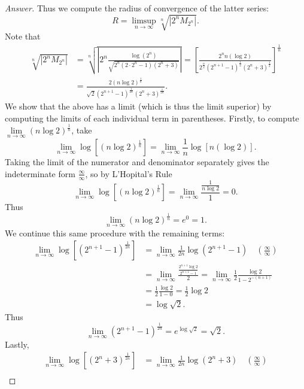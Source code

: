 \documentclass[12pt]{article}
\newcommand\paren[1]{\left( #1 \right)}
\newcommand{\sqbrack}[1]{\left [ #1 \right ]}
\newcommand{\abs}[1]{\left | #1 \right |}
\theoremstyle{definition}
\begin{document}
\begin{proof}[Answer]
    Thus we compute the radius of convergence of the latter series:
    \[
        R = \limsup\limits_{n \to \infty} \sqrt[n]{ \abs{ 2^n M_{2^n} } }.
    \]
    Note that 
    \begin{align*}
        \sqrt[n]{ \abs{ 2^n M_{2^n} } } & = \sqrt[n]{ \abs{ 2^n \frac{ \log \paren{ 2^n } }{ \sqrt{ 2^n \paren{ 2\cdot2^{n} -1 } \paren{ 2^n + 3 } } } } } = \sqbrack{ \frac{2^n n \paren{ \log 2 }}{2^{\frac{n}{2}} \paren{ 2^{n+1} - 1 }^{\frac{1}{2}} \paren{ 2^n + 3 }^{\frac{1}{2}} } }^{\frac{1}{n}} \\
        & = \frac{ 2 \paren{ n \log 2 }^{\frac{1}{n}} }{ \sqrt{2} \paren{ 2^{n+1} - 1 }^{\frac{1}{2n}} \paren{ 2^n + 3 }^{\frac{1}{2n}} }.
    \end{align*}
    We show that the above has a limit (which is thus the limit superior) by computing the limits of each individual term in parentheses. Firstly, to compute $\lim\limits_{n \to \infty} \paren{n \log2}^{\frac{1}{n}}$, take 
    \[
        \lim\limits_{n \to \infty} \log \sqbrack{ \paren{n \log2}^{\frac{1}{n}} } = \lim\limits_{n \to \infty} \frac{1}{n} \log \sqbrack{ n \paren{ \log2 } }.
    \]
    Taking the limit of the numerator and denominator separately gives the indeterminate form $\frac{\infty}{\infty}$, so by L'Hopital's Rule
    \[
        \lim\limits_{n \to \infty} \log \sqbrack{ \paren{n \log2}^{\frac{1}{n}} } = \lim\limits_{n \to \infty} \frac{\frac{1}{n \log 2}}{1} = 0.
    \]
    Thus 
    \[
        \lim\limits_{n \to \infty} \paren{n \log2}^{\frac{1}{n}} = e^0 = 1.
    \]
    We continue this same procedure with the remaining terms:
    \begin{align*}
        \lim\limits_{n \to \infty} \log \sqbrack{ \paren{ 2^{n+1} - 1 }^{\frac{1}{2n} } } & = \lim\limits_{n \to \infty} \frac{1}{2n} \log \paren{ 2^{n+1} - 1 } \quad \paren{ \frac{\infty}{\infty} } \\
        & = \lim\limits_{n \to \infty} \frac{ \frac{2^{n+1} \log 2}{2^{n+1} - 1} }{2} = \lim\limits_{n \to \infty} \frac{1}{2} \frac{\log 2}{1 - 2^{-(n+1)}} \\
        & = \frac{1}{2} \frac{\log 2}{1 - 0} = \frac{1}{2} \log 2 \\
        & = \log \sqrt{2}.
    \end{align*}
    Thus 
    \[
        \lim\limits_{n \to \infty} \paren{ 2^{n+1} - 1 }^{\frac{1}{2n} } = e^{\log \sqrt{2}} = \sqrt{2}.
    \]
    Lastly, 
    \begin{align*}
        \lim\limits_{n \to \infty} \log \sqbrack{ \paren{ 2^n +3 }^{\frac{1}{2n} } } & = \lim\limits_{n \to \infty} \frac{1}{2n} \log \paren{ 2^n +3 } \quad \paren{ \frac{\infty}{\infty} } \\

\end{align*}
\end{proof}
\end{document}
